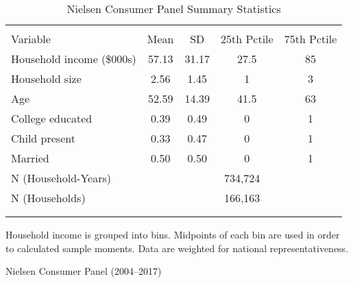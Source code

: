 \begin{table}[!htbp] \centering
\caption{Nielsen Consumer Panel Summary Statistics}
\label{tab:homescanSummaryStats}
\begin{tabular}{lcccc}
\\[-1.8ex]\hline
\hline \\[-1.8ex]
Variable                  & Mean  & SD    & 25th Pctile & 75th Pctile\\
\hline
Household income (\$000s) & 57.13 & 31.17 & 27.5        & 85 \\
Household size            & 2.56  & 1.45  & 1           & 3 \\
Age                       & 52.59 & 14.39 & 41.5        & 63 \\
College educated          & 0.39  & 0.49  & 0           & 1 \\
Child present             & 0.33  & 0.47  & 0           & 1 \\
Married                   & 0.50  & 0.50  & 0           & 1 \\
\hline
N (Household-Years)       & \multicolumn{4}{c}{734,724} \\
N (Households)            & \multicolumn{4}{c}{166,163} \\
\\[-1.8ex]\hline
\hline \\[-1.8ex]
\end{tabular}
\begin{tablenotes}
Household income is grouped into bins. Midpoints of each bin are used in order to calculated sample moments. Data are weighted for national representativeness.
\end{tablenotes}
\begin{tablenotes}[Source]
Nielsen Consumer Panel (2004--2017)
\end{tablenotes}
\end{table}
